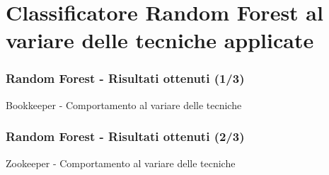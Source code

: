 \documentclass[
	usepdftitle=false,
	xcolor={table, dvipsnames},
	hyperref={
		pdftitle={Machine Learning per Software Engineering},
    	pdfauthor={Alessando Chillotti}
    }
]{beamer}
\begin{document}
\section{Classificatore Random Forest al variare delle tecniche applicate}
\begin{frame}
\frametitle{Random Forest - Risultati ottenuti (1/3)}
\begin{block}{Bookkeeper - Comportamento al variare delle tecniche}
\begin{figure}[ht!]
\end{figure}
\end{block}
\end{frame}

\begin{frame}
\frametitle{Random Forest - Risultati ottenuti (2/3)}
\begin{block}{Zookeeper - Comportamento al variare delle tecniche}
\begin{figure}[ht!]
\end{figure}
\end{block}
\end{frame}
\end{document}
